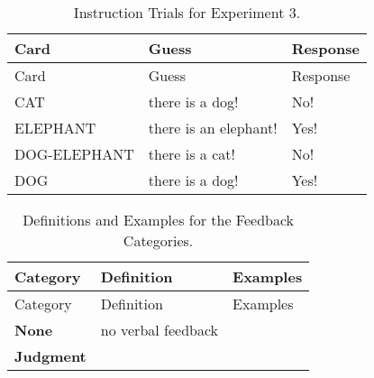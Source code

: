 \documentclass[,man,floatsintext]{apa6}
\begin{document}
\begin{longtable}[]{@{}lll@{}}
\caption{\label{tab:instructionStudy3} Instruction Trials for Experiment 3.}\tabularnewline
\toprule
Card & Guess & Response\tabularnewline
\midrule
\endfirsthead
\toprule
Card & Guess & Response\tabularnewline
\midrule
\endhead
CAT & there is a dog! & No!\tabularnewline
ELEPHANT & there is an elephant! & Yes!\tabularnewline
DOG-ELEPHANT & there is a cat! & No!\tabularnewline
DOG & there is a dog! & Yes!\tabularnewline
\bottomrule
\end{longtable}

\begin{longtable}[]{@{}lll@{}}
\caption{\label{tab:feedbackCat} Definitions and Examples for the Feedback Categories.}\tabularnewline
\toprule
\begin{minipage}[b]{0.14\columnwidth}\raggedright
Category\strut
\end{minipage} & \begin{minipage}[b]{0.46\columnwidth}\raggedright
Definition\strut
\end{minipage} & \begin{minipage}[b]{0.31\columnwidth}\raggedright
Examples\strut
\end{minipage}\tabularnewline
\midrule
\endfirsthead
\toprule
\begin{minipage}[b]{0.14\columnwidth}\raggedright
Category\strut
\end{minipage} & \begin{minipage}[b]{0.46\columnwidth}\raggedright
Definition\strut
\end{minipage} & \begin{minipage}[b]{0.31\columnwidth}\raggedright
Examples\strut
\end{minipage}\tabularnewline
\midrule
\endhead
\begin{minipage}[t]{0.14\columnwidth}\raggedright
\textbf{None}\strut
\end{minipage} & \begin{minipage}[t]{0.46\columnwidth}\raggedright
no verbal feedback\strut
\end{minipage} & \begin{minipage}[t]{0.31\columnwidth}\raggedright
\strut
\end{minipage}\tabularnewline
\begin{minipage}[t]{0.14\columnwidth}\raggedright
\textbf{Judgment}\strut
\end{minipage} & \begin{minipage}[t]{0.46\columnwidth}\raggedright

\end{minipage}
\end{longtable}
\end{document}
